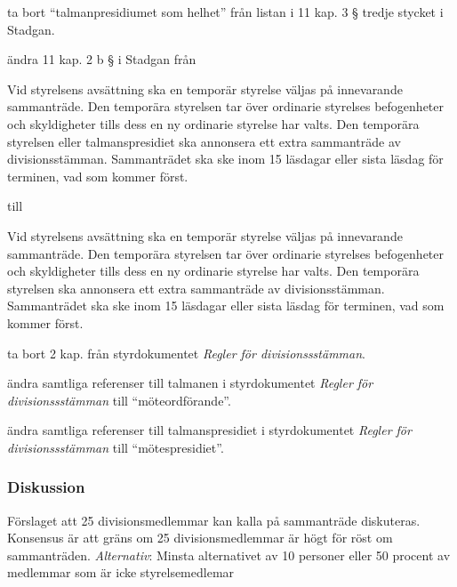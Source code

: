\documentclass[protokoll]{dvd}
\begin{document}
\begin{attsatser}
	\item ta bort ``talmanpresidiumet som helhet'' från listan i 11 kap. 3 § tredje stycket i Stadgan.

	\item ändra 11 kap. 2 b § i Stadgan från

	\begin{displayquote}
		Vid styrelsens avsättning ska en temporär styrelse väljas på innevarande sammanträde.
		Den temporära styrelsen tar över ordinarie styrelses befogenheter och skyldigheter tills dess en ny ordinarie styrelse har valts.
		Den temporära styrelsen eller talmanspresidiet ska annonsera ett extra sammanträde av divisionsstämman.
		Sammanträdet ska ske inom 15 läsdagar eller sista läsdag för terminen, vad som kommer först.
	\end{displayquote}

	till

	\begin{displayquote}
		Vid styrelsens avsättning ska en temporär styrelse väljas på innevarande sammanträde.
		Den temporära styrelsen tar över ordinarie styrelses befogenheter och skyldigheter tills dess en ny ordinarie styrelse har valts.
		Den temporära styrelsen ska annonsera ett extra sammanträde av divisionsstämman.
		Sammanträdet ska ske inom 15 läsdagar eller sista läsdag för terminen, vad som kommer först.
	\end{displayquote}

	\item ta bort 2 kap. från styrdokumentet \emph{Regler för divisionssstämman}.

	\item ändra samtliga referenser till talmanen i styrdokumentet \emph{Regler för divisionssstämman} till ``möteordförande''.

	\item ändra samtliga referenser till talmanspresidiet i styrdokumentet \emph{Regler för divisionssstämman} till ``mötespresidiet''.	
\end{attsatser}

\subsubsection{Diskussion}
Förslaget att 25 divisionsmedlemmar kan kalla på sammanträde diskuteras. Konsensus är att gräns om 25 divisionsmedlemmar är högt för röst om sammanträden.
\emph{Alternativ}: Minsta alternativet av 10 personer eller 50 procent av medlemmar som är icke styrelsemedlemar
\end{document}
